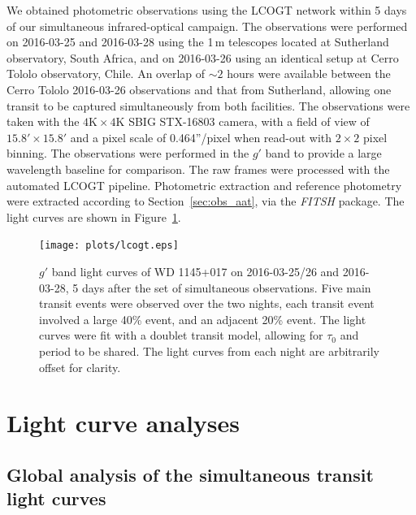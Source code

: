 \documentclass[useAMS,usenatbib]{mn2e}
\begin{document}
We obtained photometric observations using the LCOGT network \citep{2013PASP..125.1031B} within 5 days of our simultaneous infrared-optical campaign. The observations were performed on 2016-03-25 and 2016-03-28 using the 1\,m telescopes located at Sutherland observatory, South Africa, and on 2016-03-26 using an identical setup at Cerro Tololo observatory, Chile. An overlap of $\sim 2$ hours were available between the Cerro Tololo 2016-03-26 observations and that from Sutherland, allowing one transit to be captured simultaneously from both facilities. The observations were taken with the $4\mathrm{K} \times 4 \mathrm{K}$ SBIG STX-16803 camera, with a field of view of $15.8'\times 15.8'$ and a pixel scale of 0.464''/pixel when read-out with $2\times 2$ pixel binning. The observations were performed in the $g'$ band to provide a large wavelength baseline for comparison. The raw frames were processed with the automated LCOGT pipeline. Photometric extraction and reference photometry were extracted according to Section~\ref{sec:obs_aat}, via the \emph{FITSH} package. The light curves are shown in Figure~\ref{fig:lcogt}.

\begin{figure}
    \centering
    \texttt{[image: plots/lcogt.eps]}
    \caption{$g'$ band light curves of WD 1145+017 on 2016-03-25/26 and 2016-03-28, 5 days after the set of simultaneous observations. Five main transit events were observed over the two nights, each transit event involved a large 40\% event, and an adjacent 20\% event. The light curves were fit with a doublet transit model, allowing for $\tau_0$ and period to be shared. The light curves from each night are arbitrarily offset for clarity.}
    \label{fig:lcogt}
\end{figure}



\section{Light curve analyses}
\label{sec:lightcurve_model}

\subsection{Global analysis of the simultaneous transit light curves}
\label{sec:simultaneous_lc}
\end{document}

